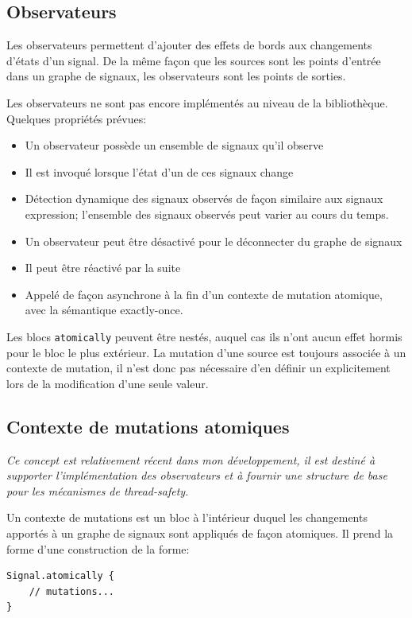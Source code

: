 \subsection{Observateurs} \label{sec:sig-obs}

Les observateurs permettent d'ajouter des effets de bords aux changements d'états d'un signal. De la même façon que les sources sont les points d'entrée dans un graphe de signaux, les observateurs sont les points de sorties.

{\itshape

Les observateurs ne sont pas encore implémentés au niveau de la bibliothèque. Quelques propriétés prévues:
\begin{itemize}
	\item Un observateur possède un ensemble de signaux qu'il observe
	\item Il est invoqué lorsque l'état d'un de ces signaux change
	\item Détection dynamique des signaux observés de façon similaire aux signaux expression; l'ensemble des signaux observés peut varier au cours du temps.
	\item Un observateur peut être désactivé pour le déconnecter du graphe de signaux
	\item Il peut être réactivé par la suite
	\item Appelé de façon asynchrone à la fin d'un contexte de mutation atomique, avec la sémantique exactly-once.
\end{itemize}



Les blocs \texttt{atomically} peuvent être nestés, auquel cas ils n'ont aucun effet hormis pour le bloc le plus extérieur. La mutation d'une source est toujours associée à un contexte de mutation, il n'est donc pas nécessaire d'en définir un explicitement lors de la modification d'une seule valeur.

}

\subsection{Contexte de mutations atomiques}
\textit{Ce concept est relativement récent dans mon développement, il est destiné à supporter l'implémentation des observateurs et à fournir une structure de base pour les mécanismes de thread-safety.}

Un contexte de mutations est un bloc à l'intérieur duquel les changements apportés à un graphe de signaux sont appliqués de façon atomiques. Il prend la forme d'une construction de la forme:
\begin{lstlisting}
Signal.atomically {
	// mutations...
}
\end{lstlisting}

